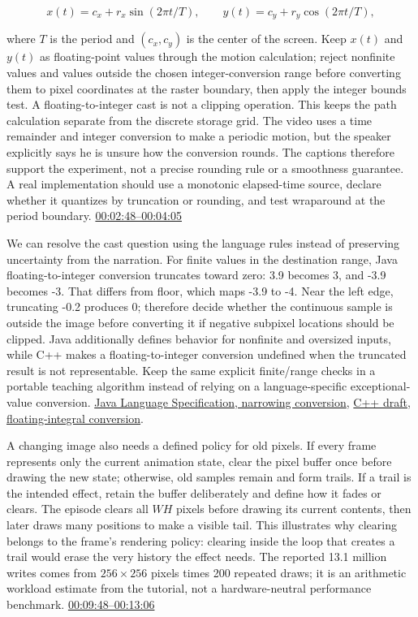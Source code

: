 \[
x(t)=c_x+r_x\sin(2\pi t/T),\qquad y(t)=c_y+r_y\cos(2\pi t/T),
\]

where \(T\) is the period and \((c_x,c_y)\) is the center of the screen. Keep \(x(t)\) and \(y(t)\) as floating-point values through the motion calculation; reject nonfinite values and values outside the chosen integer-conversion range before converting them to pixel coordinates at the raster boundary, then apply the integer bounds test. A floating-to-integer cast is not a clipping operation. This keeps the path calculation separate from the discrete storage grid. The video uses a time remainder and integer conversion to make a periodic motion, but the speaker explicitly says he is unsure how the conversion rounds. The captions therefore support the experiment, not a precise rounding rule or a smoothness guarantee. A real implementation should use a monotonic elapsed-time source, declare whether it quantizes by truncation or rounding, and test wraparound at the period boundary. \href{https://www.youtube.com/watch?v=dwn_UrItwfw&t=168s}{00:02:48--00:04:05}

We can resolve the cast question using the language rules instead of preserving uncertainty from the narration. For finite values in the destination range, Java floating-to-integer conversion truncates toward zero: 3.9 becomes 3, and -3.9 becomes -3. That differs from floor, which maps -3.9 to -4. Near the left edge, truncating -0.2 produces 0; therefore decide whether the continuous sample is outside the image before converting it if negative subpixel locations should be clipped. Java additionally defines behavior for nonfinite and oversized inputs, while C++ makes a floating-to-integer conversion undefined when the truncated result is not representable. Keep the same explicit finite/range checks in a portable teaching algorithm instead of relying on a language-specific exceptional-value conversion. \href{https://docs.oracle.com/javase/specs/jls/se21/html/jls-5.html\#jls-5.1.3}{Java Language Specification, narrowing conversion}, \href{https://eel.is/c++draft/conv.fpint}{C++ draft, floating-integral conversion}.

A changing image also needs a defined policy for old pixels. If every frame represents only the current animation state, clear the pixel buffer once before drawing the new state; otherwise, old samples remain and form trails. If a trail is the intended effect, retain the buffer deliberately and define how it fades or clears. The episode clears all \(WH\) pixels before drawing its current contents, then later draws many positions to make a visible tail. This illustrates why clearing belongs to the frame's rendering policy: clearing inside the loop that creates a trail would erase the very history the effect needs. The reported 13.1 million writes comes from \(256\times256\) pixels times 200 repeated draws; it is an arithmetic workload estimate from the tutorial, not a hardware-neutral performance benchmark. \href{https://www.youtube.com/watch?v=dwn_UrItwfw&t=588s}{00:09:48--00:13:06}

